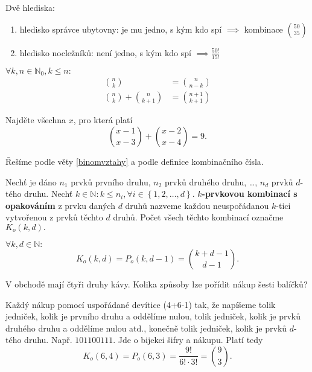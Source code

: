 \begin{reseni}
Dvě hlediska:
\begin{enumerate}[1.]
\item hledisko správce ubytovny: je mu jedno, s kým kdo spí $\implies$ kombinace $\binom{50}{35}$
\item hledisko nocležníků: není jedno, s kým kdo spí $\implies \frac{50!}{15!}$
\end{enumerate}
\end{reseni}

\begin{veta}\label{binomvztahy}
    $\forall k,n \in \mathbb N_0, k\leq n:$
    \begin{align*}
        \binom{n}{k} &= \binom{n}{n-k} \\
        \binom{n}{k} + \binom{n}{k+1} &= \binom{n+1}{k+1}
    \end{align*}
\end{veta}

\begin{priklad}
Najděte všechna $x$, pro která platí
$$\binom{x-1}{x-3}+\binom{x-2}{x-4}=9.$$
\end{priklad}

\begin{reseni}
Řešíme podle věty \ref{binomvztahy} a podle definice kombinačního čísla.
\end{reseni}

\begin{definition}
    Nechť je dáno $n_1$ prvků prvního druhu, $n_2$ prvků druhého druhu, \dots,
    $n_d$ prvků $d$-tého druhu. Nechť $k\in \mathbb N: k\leq n_i, \forall i
    \in \left \{ 1,2,\dots,d \right \}$. \textbf{$k$-prvkovou kombinací s opakováním}
    z prvku daných $d$ druhů nazveme každou neuspořádanou $k$-tici vytvořenou z
    prvků těchto $d$ druhů. Počet všech těchto kombinací označme $K_o(k,d).$
\end{definition}

\begin{veta}
    $\forall k,d \in \mathbb N:$
    $$K_o(k,d)=P_o(k,d-1)=\binom{k+d-1}{d-1}.$$
\end{veta}

\begin{priklad}
V obchodě mají čtyři druhy kávy. Kolika způsoby lze pořídit nákup šesti balíčků?
\end{priklad}

\begin{reseni}
Každý nákup  pomocí uspořádané devítice (4+6-1) tak, že napíšeme
tolik jedniček, kolik je prvního druhu a oddělíme nulou, tolik jedniček, kolik
je prvků druhého druhu a oddělíme nulou atd., konečně tolik jedniček,
kolik je prvků $d$-tého druhu. Např. $101100111$. Jde o bijekci šifry a nákupu.
Platí tedy
$$K_o(6,4)=P_o(6,3)=\frac{9!}{6!\cdot 3!}=\binom{9}{3}.$$
\end{reseni}

